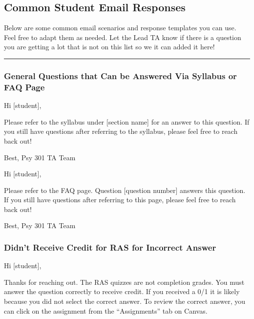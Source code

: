 \documentclass[
]{article}
\begin{document}
\hypertarget{common-student-email-responses}{%
\subsection{Common Student Email Responses}\label{common-student-email-responses}}

Below are some common email scenarios and response templates you can use. Feel free to adapt them as needed. Let the Lead TA know if there is a question you are getting a lot that is not on this list so we it can added it here!

\begin{center}\rule{0.5\linewidth}{0.5pt}\end{center}

\hypertarget{general-questions-that-can-be-answered-via-syllabus-or-faq-page}{%
\subsubsection{General Questions that Can be Answered Via Syllabus or FAQ Page}\label{general-questions-that-can-be-answered-via-syllabus-or-faq-page}}

Hi {[}student{]},

Please refer to the syllabus under {[}section name{]} for an answer to this question. If you still have questions after referring to the syllabus, please feel free to reach back out!

Best,
Psy 301 TA Team

Hi {[}student{]},

Please refer to the FAQ page. Question {[}question number{]} answers this question. If you still have questions after referring to this page, please feel free to reach back out!

Best,
Psy 301 TA Team

\hypertarget{didnt-receive-credit-for-ras-for-incorrect-answer}{%
\subsubsection{Didn't Receive Credit for RAS for Incorrect Answer}\label{didnt-receive-credit-for-ras-for-incorrect-answer}}

Hi {[}student{]},

Thanks for reaching out. The RAS quizzes are not completion grades. You must answer the question correctly to receive credit. If you received a 0/1 it is likely because you did not select the correct answer. To review the correct answer, you can click on the assignment from the ``Assignments'' tab on Canvas.
\end{document}
